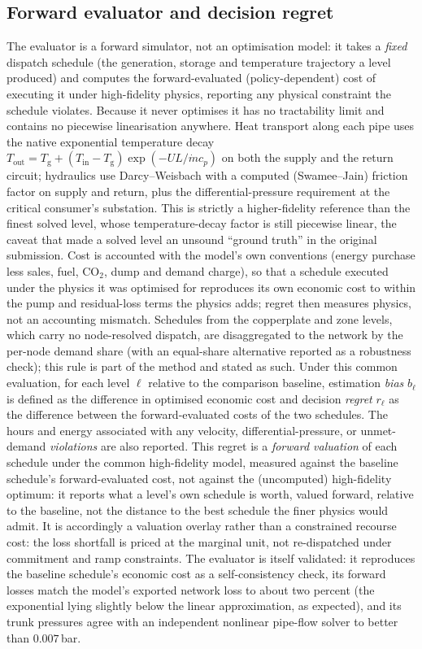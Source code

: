 \documentclass[a4paper,fleqn]{cas-sc}
\providecommand{\DIFadd}[1]{{\protect\color[HTML]{1A5FB4} #1}} %
\providecommand{\DIFaddbegin}{} %
\providecommand{\DIFaddend}{} %
\newcommand{\DIFaddincludegraphics}[2][]{{\color{blue}\fbox{\DIFOincludegraphics[#1]{#2}}}} %
\DeclareRobustCommand{\DIFaddbegin}{\DIFOaddbegin \let\includegraphics\DIFaddincludegraphics} %
\DeclareRobustCommand{\DIFaddend}{\DIFOaddend \let\includegraphics\DIFOincludegraphics} %
\begin{document}
\subsection{Forward evaluator and decision regret}
\label{subsec:evaluator}
The evaluator is a forward simulator, not an optimisation model: it takes a \emph{fixed}
dispatch schedule (the generation, storage and temperature trajectory a level produced)
and computes the forward-evaluated (policy-dependent) cost of executing it under high-fidelity
physics, reporting any physical
constraint the schedule violates. Because it never optimises it has no tractability limit and
contains no piecewise linearisation anywhere. Heat transport along each pipe uses the native
exponential temperature decay $T_\text{out}=T_\text{g}+(T_\text{in}-T_\text{g})\exp(-U L/\dot m
c_p)$ on both the supply and the return circuit; hydraulics use Darcy--Weisbach with a
computed (Swamee--Jain) friction factor on supply and return, plus the differential-pressure
requirement at the critical consumer's substation. This is strictly a higher-fidelity
reference than the finest solved level, whose temperature-decay factor is still piecewise
linear, the caveat that made a solved level an unsound ``ground truth'' in the original
submission. Cost is accounted with the model's own conventions (energy purchase less sales,
fuel, CO$_2$, dump and demand charge), so that a schedule executed under the physics it was
optimised for reproduces its own economic cost to within the pump and residual-loss terms
the physics adds; regret then measures physics, not an accounting mismatch. Schedules from the
copperplate and zone levels, which carry no node-resolved dispatch, are disaggregated to the
network by the per-node demand share (with an equal-share alternative reported as a
robustness check); this rule is part of the method and stated as such. Under this common evaluation, for each level \(\ell\) relative to the comparison baseline,
estimation \emph{bias} \DIFaddbegin \DIFadd{\(b_\ell\) }\DIFaddend is defined as the difference in optimised economic cost and
decision \emph{regret} \DIFaddbegin \DIFadd{\(r_\ell\) }\DIFaddend as the difference between the forward-evaluated costs of the
two schedules.
The hours and energy associated with any velocity, differential-pressure, or unmet-demand
\emph{violations} are also reported. This regret is a \emph{forward valuation} of each
schedule under the common high-fidelity model, measured against the baseline schedule's
forward-evaluated cost, not against the (uncomputed) high-fidelity optimum: it reports what a
level's own schedule is worth, valued forward, relative to the baseline, not the distance to
the best schedule the finer physics would admit. It is accordingly a valuation overlay rather
than a constrained recourse cost: the loss shortfall is priced at the marginal unit, not
re-dispatched under commitment and ramp constraints. The evaluator
is itself validated: it reproduces the baseline schedule's economic cost as a self-consistency
check, its forward losses match the model's exported network loss to about two percent (the
exponential lying slightly below the linear approximation, as expected), and its trunk
pressures agree with an independent nonlinear pipe-flow solver to better than $0.007$\,bar.
\end{document}
